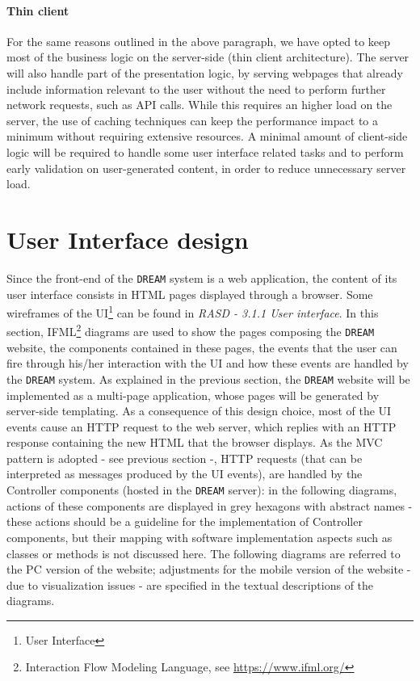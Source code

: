 \documentclass{article}
\begin{document}
\paragraph{Thin client}
For the same reasons outlined in the above paragraph, we have opted to keep most of the business logic on the server-side (thin client architecture). The server will also handle part of the presentation logic, by serving webpages that already include information relevant to the user without the need to perform further network requests, such as API calls. While this requires an higher load on the server, the use of caching techniques can keep the performance impact to a minimum without requiring extensive resources.
A minimal amount of client-side logic will be required to handle some user interface related tasks and to perform early validation on user-generated content, in order to reduce unnecessary server load.

\newpage
\section{User Interface design}
Since the front-end of the \verb|DREAM| system is a web application, the content of its user interface consists in HTML pages displayed through a browser. Some wireframes of the UI\footnote{User Interface} can be found in \textit{RASD - 3.1.1 User interface}. In this section, IFML\footnote{Interaction Flow Modeling Language, see \url{https://www.ifml.org/}} diagrams are used to show the pages composing the \verb|DREAM| website, the components contained in these pages, the events that the user can fire through his/her interaction with the UI and how these events are handled by the \verb|DREAM| system.
As explained in the previous section, the \verb|DREAM| website will be implemented as a multi-page application, whose pages will be generated by server-side templating. As a consequence of this design choice, most of the UI events cause an HTTP request to the web server, which replies with an HTTP response containing the new HTML that the browser displays. As the MVC pattern is adopted - see previous section -, HTTP requests (that can be interpreted as messages produced by the UI events), are handled by the Controller components (hosted in the \verb|DREAM| server): in the following diagrams, actions of these components are displayed in grey hexagons with abstract names - these actions should be a guideline for the implementation of Controller components, but their mapping with software implementation aspects such as classes or methods is not discussed here.
The following diagrams are referred to the PC version of the website; adjustments for the mobile version of the website - due to visualization issues - are specified in the textual descriptions of the diagrams.
\vspace{9cm}
\end{document}
